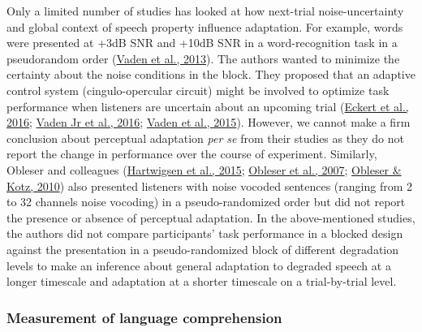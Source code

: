 \documentclass[a4paper, nobind]{templates/ociamthesis}
\begin{document}
Only a limited number of studies has looked at how next-trial noise-uncertainty and global context of speech property influence adaptation.
For example, words were presented at +3dB SNR and +10dB SNR in a word-recognition task in a pseudorandom order (\protect\hyperlink{ref-Vaden2013}{Vaden et al., 2013}).
The authors wanted to minimize the certainty about the noise conditions in the block.
They proposed that an adaptive control system (cingulo-opercular circuit) might be involved to optimize task performance when listeners are uncertain about an upcoming trial (\protect\hyperlink{ref-Eckert2016}{Eckert et al., 2016}; \protect\hyperlink{ref-Vaden2016}{Vaden Jr et al., 2016}; \protect\hyperlink{ref-Vaden2015}{Vaden et al., 2015}).
However, we cannot make a firm conclusion about perceptual adaptation \emph{per se} from their studies as they do not report the change in performance over the course of experiment.
Similarly, Obleser and colleagues (\protect\hyperlink{ref-Hartwigsen2015}{Hartwigsen et al., 2015}; \protect\hyperlink{ref-Obleser2007}{Obleser et al., 2007}; \protect\hyperlink{ref-Obleser2010}{Obleser \& Kotz, 2010}) also presented listeners with noise vocoded sentences (ranging from 2 to 32 channels noise vocoding) in a pseudo-randomized order but did not report the presence or absence of perceptual adaptation.
In the above-mentioned studies, the authors did not compare participants' task performance in a blocked design against the presentation in a pseudo-randomized block of different degradation levels to make an inference about general adaptation to degraded speech at a longer timescale and adaptation at a shorter timescale on a trial-by-trial level.

\hypertarget{measurement-of-language-comprehension}{%
\subsubsection{Measurement of language comprehension}\label{measurement-of-language-comprehension}}
\end{document}
